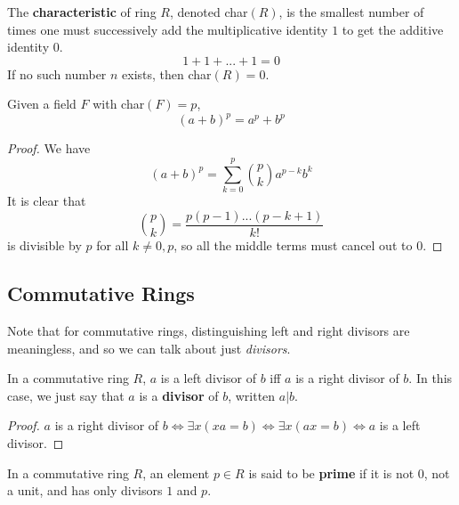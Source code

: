   \begin{definition}
    The \textbf{characteristic} of ring $R$, denoted char$(R)$, is the smallest number of times one must successively add the multiplicative identity $1$ to get the additive identity $0$. 
    \begin{equation}
      1 + 1 + ... + 1 = 0 
    \end{equation}
    If no such number $n$ exists, then char$(R) = 0$. 
  \end{definition}

  \begin{theorem}
    Given a field $F$ with char$(F) = p$, 
    \begin{equation}
      (a + b)^p = a^p + b^p
    \end{equation}
  \end{theorem}
  \begin{proof}
    We have 
    \begin{equation}
      (a + b)^p = \sum_{k = 0}^p \binom{p}{k} a^{p-k} b^{k}
    \end{equation}
    It is clear that 
    \begin{equation}
      \binom{p}{k} = \frac{p (p-1) ... (p - k+1)}{k!}
    \end{equation}
    is divisible by $p$ for all $k \neq 0, p$, so all the middle terms must cancel out to $0$. 
  \end{proof}

\subsection{Commutative Rings} 

  Note that for commutative rings, distinguishing left and right divisors are meaningless, and so we can talk about just \textit{divisors}. 

  \begin{lemma}[Left=Right Divisors]
    In a commutative ring $R$, $a$ is a left divisor of $b$ iff $a$ is a right divisor of $b$. In this case, we just say that $a$ is a \textbf{divisor} of $b$, written $a | b$. 
  \end{lemma}
  \begin{proof}
    $a$ is a right divisor of $b \iff \exists x (xa = b) \iff \exists x (ax = b) \iff a$ is a left divisor. 
  \end{proof} 

  \begin{definition}
    In a commutative ring $R$, an element $p \in R$ is said to be \textbf{prime} if it is not $0$, not a unit, and has only divisors $1$ and $p$. 
  \end{definition}

